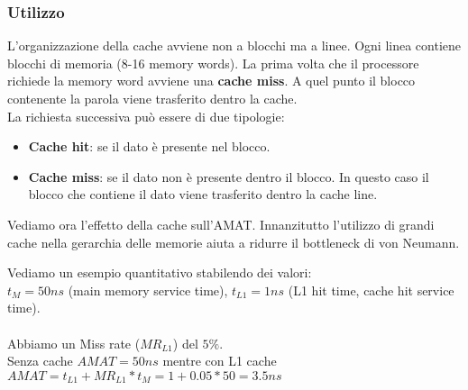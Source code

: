 \subsubsection{Utilizzo}
L'organizzazione della cache avviene non a blocchi ma a linee. Ogni linea contiene blocchi di memoria (8-16 memory words). La prima volta che il processore richiede la memory word avviene una \textbf{cache miss}. A quel punto il blocco contenente la parola viene trasferito dentro la cache.\\
La richiesta successiva può essere di due tipologie:
\begin{itemize}
    \item \textbf{Cache hit}: se il dato è presente nel blocco.
    \item \textbf{Cache miss}: se il dato non è presente dentro il blocco. In questo caso il blocco che contiene il dato viene trasferito dentro la cache line.
\end{itemize}

Vediamo ora l'effetto della cache sull'AMAT. Innanzitutto l'utilizzo di grandi cache nella gerarchia delle memorie aiuta a ridurre il bottleneck di von Neumann. 
\begin{example}
Vediamo un esempio quantitativo stabilendo dei valori:\\
$t_M = 50ns$ (main memory service time), $t_{L1} = 1ns$ (L1 hit time, cache hit service time). \\\\
Abbiamo un Miss rate ($MR_{L1}$) del $5\%$.\\
Senza cache $AMAT = 50ns$ mentre con L1 cache $AMAT = t_{L1} + MR_{L1} * t_M = 1 + 0.05 * 50 = 3.5ns$
\end{example}


